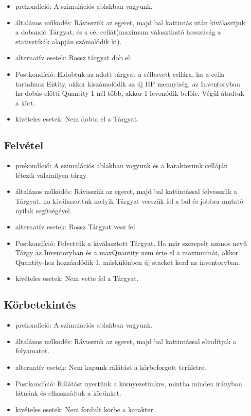 \begin{itemize}
    \item prekondíció: A szimulációs ablakban vagyunk.
    \item általános működés: Rávisszük az egeret, majd bal kattintás után kiválasztjuk a dobandó Tárgyat, és a cél cellát(maximum választható hosszúság a statisztikák alapján számolódik ki).
    \item alternatív esetek: Rossz tárgyat dob el.
    \item Postkondíció: Eldobtuk az adott tárgyat a célbavett cellára, ha a cella tartalmaz Entity, akkor kiszámolódik az új HP mennyiség, az Inventoryban ha dobás előtti Quantity 1-nél több, akkor 1 levonódik belőle. Végül átadtuk a kört.
    \item kivételes esetek: Nem dobta el a Tárgyat.
\end{itemize}

\subsection{Felvétel}

\begin{itemize}
    \item prekondíció: A szimulációs ablakban vagyunk és a karakterünk celláján létezik valamilyen tárgy.
    \item általános működés: Rávisszük az egeret, majd bal kattintással felvesszük a Tárgyat, ha kiválaszottuk melyik Tárgyat vesszük fel a bal és jobbra mutató nyilak segítségével.
    \item alternatív esetek: Rossz Tárgyat vesz fel.
    \item Postkondíció: Felvettük a kiválasztott Tárgyat. Ha már szerepelt azonos nevű Tárgy az Inventoryban és a maxQuantity nem érte el a maximumát, akkor Quantity-hez hozzáadódik 1, máskülönben új stacket kezd az inventoryban.
    \item kivételes esetek: Nem vette fel a Tárgyat.
\end{itemize}

\subsection{Körbetekintés}

\begin{itemize}
    \item prekondíció: A szimulációs ablakban vagyunk.
    \item általános működés: Rávisszük az egeret, majd bal kattintással elindítjuk a folyamatot.
    \item alternatív esetek: Nem kapunk rálátást a körbeforgott területre.
    \item Postkondíció: Rálátást nyertünk a környezetünkre, mintha minden irányban látnánk és elhasználtuk a körünket.
    \item kivételes esetek: Nem fordult körbe a karakter.
\end{itemize}

